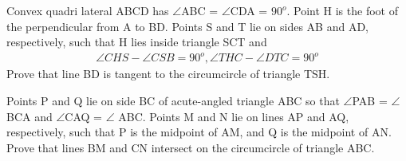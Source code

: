 \item Convex quadri lateral ABCD has $\angle$ABC = $\angle$CDA = $90^{o}$. Point H is the foot of the perpendicular from A to BD. Points S and T lie on sides AB and AD, respectively, such that H lies inside triangle SCT and
\begin{align*}
\angle CHS - \angle CSB = 90^{o}, \angle THC - \angle DTC = 90^{o}
\end{align*}
Prove that line BD is tangent to the circumcircle of triangle TSH.

\item Points P and Q lie on side BC of acute-angled triangle ABC so that $\angle$PAB = $\angle$BCA and $\angle$CAQ = $\angle$ ABC. Points M and N lie on lines AP and AQ, respectively, such that P is the midpoint of AM, and Q is the midpoint of AN. Prove that lines BM and CN intersect on the circumcircle of triangle ABC.

